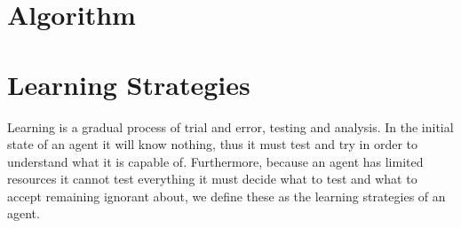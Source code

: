 \documentclass[master.tex]{subfiles}
\begin{document}
	\section{Algorithm}
		

	\begin{comment}

	    \section*{Sec1}

	    Learning has two important steps to it, the first is figuring out
	    what to do in order to learn about something and the second is analysis
	    of what occured to understand and actually learn about it.


	    Analysing an outcome is about figuring out what occured and what did
	    not occur. For instance if one pressed

	    In a STRIPS domain, all actions are absolute thus we know that if
	    an action changed the state then the action's preconditions was satisfied
	    and all predicates added
    \end{comment}



    \section*{Learning Strategies} \label{sec:strats}

    Learning is a gradual process of trial and error, testing and analysis.
    In the initial state of an agent it will know nothing, thus it must
    test and try in order to understand what it is capable of. Furthermore, because an agent has limited resources it cannot test everything it must decide what to test and what to accept remaining ignorant about, we define these as the learning strategies of an agent.
\end{document}

